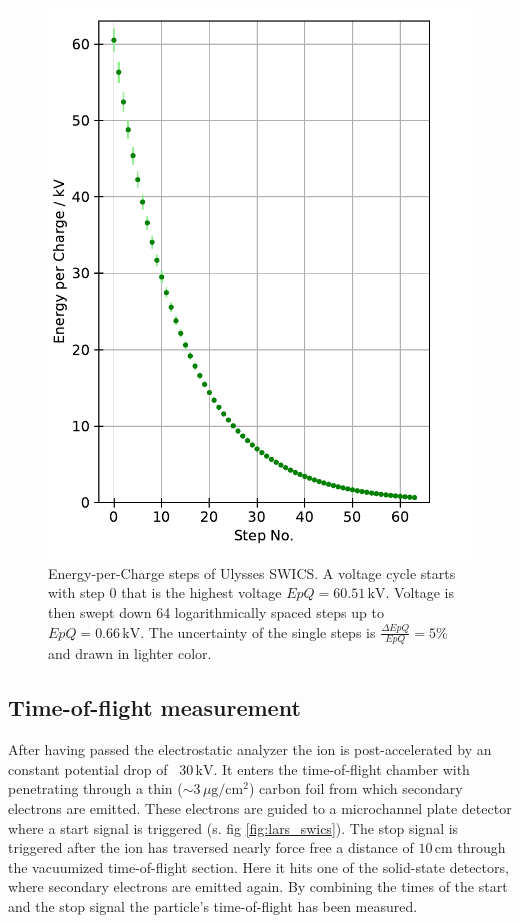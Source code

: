 %
\begin{figure}[h]
		\centering
		\includegraphics[scale = 0.7]{Figures/epq_err.pdf}
		\caption{Energy-per-Charge steps of Ulysses SWICS. A voltage cycle starts with step 0 that is the highest voltage $EpQ = 60.51\, \mathrm{kV}$. Voltage is then swept down 64 logarithmically spaced steps up to $EpQ = 0.66\, \mathrm{kV}$. The uncertainty of the single steps is $\frac{\Delta EpQ}{EpQ} = 5\%$ and drawn in lighter color.
		} \label{fig:epq}
\end{figure}
%
%
%
\subsection{Time-of-flight measurement}
After having passed the electrostatic analyzer the ion is post-accelerated by an constant potential drop of ~$30\,\mathrm{kV}$. It enters the time-of-flight chamber with penetrating through a thin ($\sim 3\,\mu \mathrm{g / cm^2}$) carbon foil from which secondary electrons are emitted. These electrons are guided to a microchannel plate detector where a start signal is triggered (s. fig \ref{fig:lars_swics}). The stop signal is triggered after the ion has traversed nearly force free a distance of $10\,\mathrm{cm}$ through the vacuumized time-of-flight section. Here it hits one of the solid-state detectors, where secondary electrons are emitted again. By combining the times of the start and the stop signal the particle's time-of-flight has been measured.

